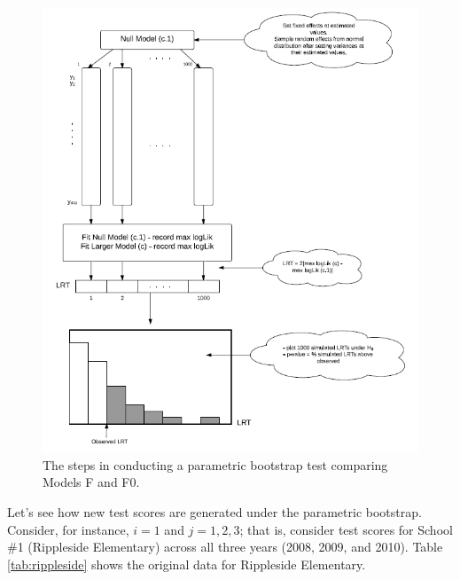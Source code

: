 \documentclass[
]{krantz}
\begin{document}
\begin{figure}
\includegraphics[width=1\linewidth,height=1\textheight]{data/ParametricBootstrapDiagram} \caption{The steps in conducting a parametric bootstrap test comparing Models F and F0.}\label{fig:parabootdiagram}
\end{figure}

Let's see how new test scores are generated under the parametric bootstrap. Consider, for instance, \(i=1\) and \(j=1,2,3\); that is, consider test scores for School \#1 (Rippleside Elementary) across all three years (2008, 2009, and 2010). Table \ref{tab:rippleside} shows the original data for Rippleside Elementary.

\begin{table}

\caption{\label{tab:rippleside}Original data for Rippleside Elementary (School 1).}
\centering
{}
\end{table}
\end{document}
